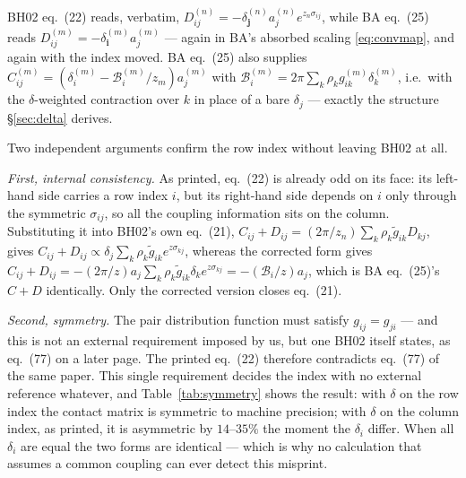 \documentclass[11pt,a4paper]{article}
\newcommand{\eqBH}[1]{eq.~(#1)}
\begin{document}
BH02 \eqBH{22} reads, verbatim,
$D^{(n)}_{ij}=-\delta^{(n)}_{\boldsymbol j}a^{(n)}_je^{z_n\sigma_{ij}}$,
while BA \eqBH{25} reads
$D^{(m)}_{ij}=-\delta^{(m)}_{\boldsymbol i}a^{(m)}_j$ --- again in BA's absorbed
scaling \eqref{eq:convmap}, and again with the index moved. BA \eqBH{25} also
supplies $C^{(m)}_{ij}=(\delta^{(m)}_i-\mathcal B^{(m)}_i/z_m)a^{(m)}_j$ with
$\mathcal B^{(m)}_i=2\pi\sum_k\rho_kg^{(m)}_{ik}\delta^{(m)}_k$, i.e.\ with the
$\delta$-weighted contraction over $k$ in place of a bare $\delta_j$ --- exactly
the structure \S\ref{sec:delta} derives.

Two independent arguments confirm the row index without leaving BH02 at all.

\emph{First, internal consistency.} As printed, \eqBH{22} is already odd on its
face: its left-hand side carries a row index $i$, but its right-hand side
depends on $i$ only through the symmetric $\sigma_{ij}$, so all the coupling
information sits on the column. Substituting it into BH02's own \eqBH{21},
$C_{ij}+D_{ij}=(2\pi/z_n)\sum_k\rho_k\tilde g_{ik}D_{kj}$, gives
$C_{ij}+D_{ij}\propto\delta_j\sum_k\rho_k\tilde g_{ik}e^{z\sigma_{kj}}$,
whereas the corrected form gives
$C_{ij}+D_{ij}=-(2\pi/z)a_j\sum_k\rho_k\tilde g_{ik}\delta_ke^{z\sigma_{kj}}
=-(\mathcal B_i/z)a_j$, which is BA \eqBH{25}'s $C+D$ identically. Only the
corrected version closes \eqBH{21}.

\emph{Second, symmetry.} The pair distribution function must satisfy
$g_{ij}=g_{ji}$ --- and this is not an external requirement imposed by us, but
one BH02 itself states, as \eqBH{77} on a later page. The printed \eqBH{22}
therefore contradicts \eqBH{77} of the same paper. This single requirement
decides the index with no external reference whatever, and
Table~\ref{tab:symmetry} shows the result:
with $\delta$ on the row index the contact matrix is symmetric to machine
precision; with $\delta$ on the column index, as printed, it is asymmetric by
$14$--$35\%$ the moment the $\delta_i$ differ. When all $\delta_i$ are equal
the two forms are identical --- which is why no calculation that assumes a
common coupling can ever detect this misprint.
\end{document}
